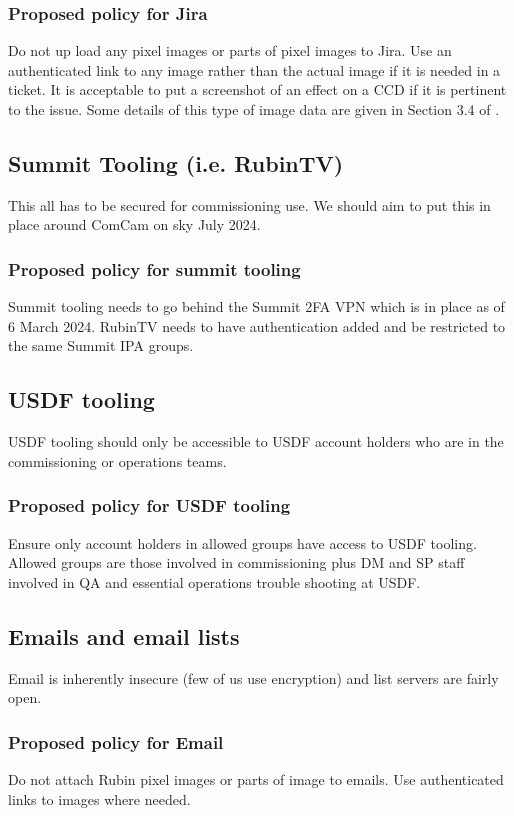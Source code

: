 \subsubsection{Proposed policy for Jira}
Do not up load any pixel images or parts of pixel images to Jira.
Use an authenticated link to any image rather than the actual image if it is needed in a ticket.
It is acceptable to put a screenshot of an effect on a CCD if it is pertinent to the issue.
Some details of this type of image data are given in Section 3.4 of .

\subsection{Summit Tooling (i.e. RubinTV)}
This all has to be secured for commissioning use.
We should aim to put this in place around ComCam on sky July 2024.

\subsubsection{Proposed policy for summit tooling}
Summit tooling needs to go behind the Summit 2FA VPN which is in place as of 6 March 2024.
RubinTV needs to have authentication added and be restricted to the same Summit IPA groups.

\subsection{USDF tooling}
USDF tooling should only be accessible to USDF account holders who are in the commissioning or operations teams.
\subsubsection{Proposed policy for USDF tooling}
Ensure only account holders in allowed groups have access to USDF tooling.
Allowed groups are those involved in commissioning plus DM and SP staff involved in QA and essential operations trouble shooting at USDF.

\subsection{Emails and email lists}
Email is inherently insecure (few of us use encryption) and list servers are fairly open.

\subsubsection{Proposed policy for Email}
Do not attach Rubin pixel images or parts of image to emails.
Use authenticated links to images where needed.


